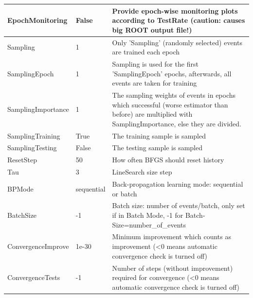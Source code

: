\documentclass[11pt]{scrartcl}
\begin{document}
\begin{longtable}[c]{|p{4cm}|p{2.5cm}|p{7cm}|}
EpochMonitoring    & False      & Provide epoch-wise monitoring plots according to TestRate (caution: causes big ROOT output file!)                                                      \\ \hline
Sampling           & 1          & Only ’Sampling’ (randomly selected) events are trained each epoch                                                                                      \\ \hline
SamplingEpoch      & 1          & Sampling is used for the first ’SamplingEpoch’ epochs, afterwards, all events are taken for training                                                   \\ \hline
SamplingImportance & 1          & The sampling weights of events in epochs which successful (worse estimator than before) are multiplied with SamplingImportance, else they are divided. \\ \hline
SamplingTraining   & True       & The training sample is sampled                                                                                                                         \\ \hline
SamplingTesting    & False      & The testing sample is sampled                                                                                                                          \\ \hline
ResetStep          & 50         & How often BFGS should reset history                                                                                                                    \\ \hline
Tau                & 3          & LineSearch size step                                                                                                                                   \\ \hline
BPMode             & sequential & Back-propagation learning mode: sequential or batch                                                                                                    \\ \hline
BatchSize          & -1         & Batch size: number of events/batch, only set if in Batch Mode, -1 for Batch- Size=number\_of\_events                                                   \\ \hline
ConvergenceImprove & 1e-30      & Minimum improvement which counts as improvement (\textless{}0 means automatic convergence check is turned off)                                         \\ \hline
ConvergenceTests   & -1         & Number of steps (without improvement) required for convergence (\textless{}0 means automatic convergence check is turned off)                          \\ \hline

\end{longtable}
\end{document}
